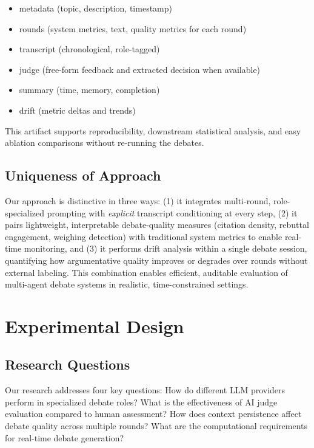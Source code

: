 \documentclass{article}
\begin{document}
\begin{itemize}
    \item metadata (topic, description, timestamp)
    \item rounds (system metrics, text, quality metrics for each round)
    \item transcript (chronological, role-tagged)
    \item judge (free-form feedback and extracted decision when available)
    \item summary (time, memory, completion)
    \item drift (metric deltas and trends)
\end{itemize}

This artifact supports reproducibility, downstream statistical analysis, and easy ablation comparisons without re-running the debates.

\subsection{Uniqueness of Approach}

Our approach is distinctive in three ways: (1) it integrates multi-round, role-specialized prompting with \emph{explicit} transcript conditioning at every step, (2) it pairs lightweight, interpretable debate-quality measures (citation density, rebuttal engagement, weighing detection) with traditional system metrics to enable real-time monitoring, and (3) it performs drift analysis within a single debate session, quantifying how argumentative quality improves or degrades over rounds without external labeling. This combination enables efficient, auditable evaluation of multi-agent debate systems in realistic, time-constrained settings.

\section{Experimental Design}

\subsection{Research Questions}

Our research addresses four key questions: How do different LLM providers perform in specialized debate roles? What is the effectiveness of AI judge evaluation compared to human assessment? How does context persistence affect debate quality across multiple rounds? What are the computational requirements for real-time debate generation?
\end{document}
